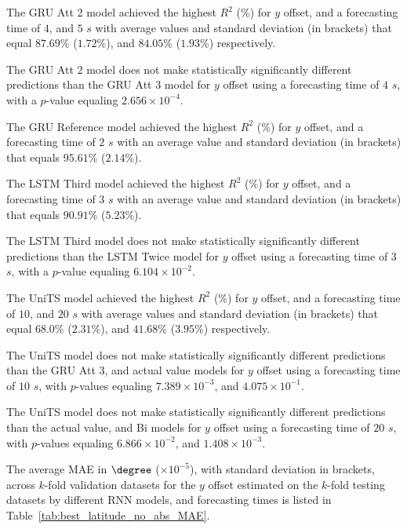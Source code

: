 The GRU Att 2 model achieved the highest $R^{2}$ (\%) for $y$ offset, and a forecasting time of $4$, and $5$ $s$ with average values and standard deviation (in brackets) that equal $87.69$\% ($1.72$\%), and $84.05$\% ($1.93$\%) respectively.

The GRU Att 2 model does not make statistically significantly different predictions than the GRU Att 3 model for $y$ offset using a forecasting time of $4$ $s$, with a $p$-value equaling $2.656 \times 10^{-4}$.


The GRU Reference model achieved the highest $R^{2}$ (\%) for $y$ offset, and a forecasting time of $2$ $s$ with an average value and standard deviation (in brackets) that equals $95.61$\% ($2.14$\%).

The LSTM Third model achieved the highest $R^{2}$ (\%) for $y$ offset, and a forecasting time of $3$ $s$ with an average value and standard deviation (in brackets) that equals $90.91$\% ($5.23$\%).

The LSTM Third model does not make statistically significantly different predictions than the LSTM Twice model for $y$ offset using a forecasting time of $3$ $s$, with a $p$-value equaling $6.104 \times 10^{-2}$.


The UniTS model achieved the highest $R^{2}$ (\%) for $y$ offset, and a forecasting time of $10$, and $20$ $s$ with average values and standard deviation (in brackets) that equal $68.0$\% ($2.31$\%), and $41.68$\% ($3.95$\%) respectively.

The UniTS model does not make statistically significantly different predictions than the GRU Att 3, and actual value models for $y$ offset using a forecasting time of $10$ $s$, with $p$-values equaling $7.389 \times 10^{-3}$, and $4.075 \times 10^{-1}$.


The UniTS model does not make statistically significantly different predictions than the actual value, and Bi models for $y$ offset using a forecasting time of $20$ $s$, with $p$-values equaling $6.866 \times 10^{-2}$, and $1.408 \times 10^{-3}$.


The average MAE in $\degree$ ($\times 10^{-5}$), with standard deviation in brackets, across $k$-fold validation datasets for the $y$ offset estimated on the $k$-fold testing datasets by different RNN models, and forecasting times is listed in Table~\ref{tab:best_latitude_no_abs_MAE}.

